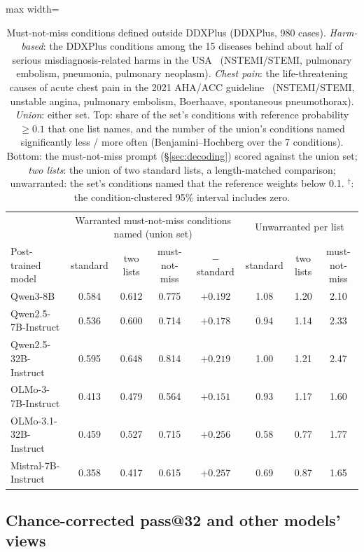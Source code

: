 \documentclass[wcp]{jmlr}
\begin{document}
\begin{table}[t]
\medskip
\begin{adjustbox}{max width=\linewidth}
\begin{tabular}{lccccccc}
\toprule
 & \multicolumn{4}{c}{Warranted must-not-miss conditions named (union set)} & \multicolumn{3}{c}{Unwarranted per list} \\
Post-trained model & standard & two lists & must-not-miss & $-$ standard & standard & two lists & must-not-miss \\
\midrule
Qwen3-8B & 0.584 & 0.612 & 0.775 & $+0.192$ & 1.08 & 1.20 & 2.10 \\
Qwen2.5-7B-Instruct & 0.536 & 0.600 & 0.714 & $+0.178$ & 0.94 & 1.14 & 2.33 \\
Qwen2.5-32B-Instruct & 0.595 & 0.648 & 0.814 & $+0.219$ & 1.00 & 1.21 & 2.47 \\
OLMo-3-7B-Instruct & 0.413 & 0.479 & 0.564 & $+0.151$ & 0.93 & 1.17 & 1.60 \\
OLMo-3.1-32B-Instruct & 0.459 & 0.527 & 0.715 & $+0.256$ & 0.58 & 0.77 & 1.77 \\
Mistral-7B-Instruct & 0.358 & 0.417 & 0.615 & $+0.257$ & 0.69 & 0.87 & 1.65 \\
\bottomrule
\end{tabular}
\end{adjustbox}
\caption{Must-not-miss conditions defined outside DDXPlus (DDXPlus, 980 cases). \emph{Harm-based}: the DDXPlus conditions among the 15 diseases behind about half of serious misdiagnosis-related harms in the USA~\citep{newmantoker2024burden} (NSTEMI/STEMI, pulmonary embolism, pneumonia, pulmonary neoplasm). \emph{Chest pain}: the life-threatening causes of acute chest pain in the 2021 AHA/ACC guideline~\citep{gulati2021chestpain} (NSTEMI/STEMI, unstable angina, pulmonary embolism, Boerhaave, spontaneous pneumothorax). \emph{Union}: either set. Top: share of the set's conditions with reference probability $\geq 0.1$ that one list names, and the number of the union's conditions named significantly less / more often (Benjamini--Hochberg over the 7 conditions). Bottom: the must-not-miss prompt (\S\ref{sec:decoding}) scored against the union set; \emph{two lists}: the union of two standard lists, a length-matched comparison; unwarranted: the set's conditions named that the reference weights below 0.1. $^{\dagger}$: the condition-clustered 95\% interval includes zero.}
\label{tab:extmnm}
\end{table}

\subsection{Chance-corrected pass@32 and other models' views}\label{sec:chance}
\end{document}
